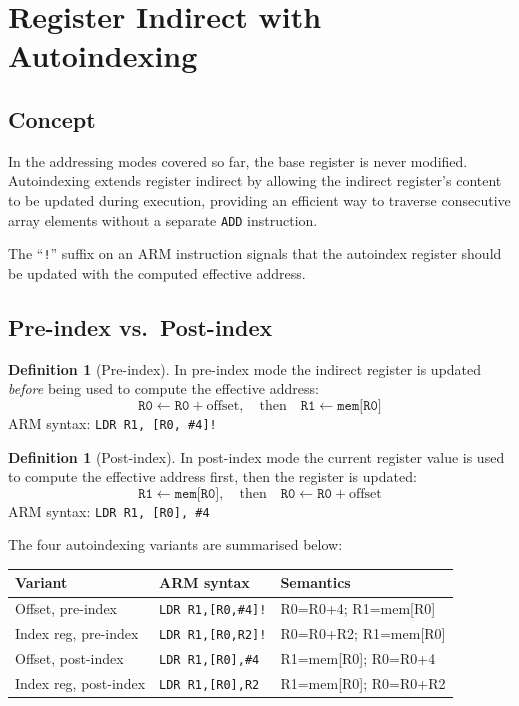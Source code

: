 \documentclass[11pt, a4paper, notitlepage]{report}
\theoremstyle{definition}
\newtheorem{definition}[theorem]{Definition}
\theoremstyle{remark}
\theoremstyle{definition}
\begin{document}
\section{Register Indirect with Autoindexing}

\subsection{Concept}

In the addressing modes covered so far, the base register is never modified. Autoindexing extends register indirect by allowing the indirect register's content to be updated during execution, providing an efficient way to traverse consecutive array elements without a separate \texttt{ADD} instruction.

The ``\texttt{!}'' suffix on an ARM instruction signals that the autoindex register should be updated with the computed effective address.

\subsection{Pre-index vs.\ Post-index}

\begin{definition}[Pre-index]
\label{def:pre-index}
In pre-index mode the indirect register is updated \emph{before} being used to compute the effective address:
\[
  \texttt{R0} \leftarrow \texttt{R0} + \text{offset},\quad\text{then}\quad \texttt{R1} \leftarrow \texttt{mem[R0]}
\]
ARM syntax: \texttt{LDR R1, [R0, \#4]!}
\end{definition}

\begin{definition}[Post-index]
\label{def:post-index}
In post-index mode the current register value is used to compute the effective address first, then the register is updated:
\[
  \texttt{R1} \leftarrow \texttt{mem[R0]},\quad\text{then}\quad \texttt{R0} \leftarrow \texttt{R0} + \text{offset}
\]
ARM syntax: \texttt{LDR R1, [R0], \#4}
\end{definition}

The four autoindexing variants are summarised below:

\begin{center}
\begin{tabularx}{\textwidth}{llX}
\toprule
\textbf{Variant} & \textbf{ARM syntax} & \textbf{Semantics} \\
\midrule
Offset, pre-index & \texttt{LDR R1,[R0,\#4]!} & R0=R0+4; R1=mem[R0] \\
Index reg, pre-index & \texttt{LDR R1,[R0,R2]!} & R0=R0+R2; R1=mem[R0] \\
Offset, post-index & \texttt{LDR R1,[R0],\#4} & R1=mem[R0]; R0=R0+4 \\
Index reg, post-index & \texttt{LDR R1,[R0],R2} & R1=mem[R0]; R0=R0+R2 \\
\bottomrule
\end{tabularx}
\end{center}
\end{document}
